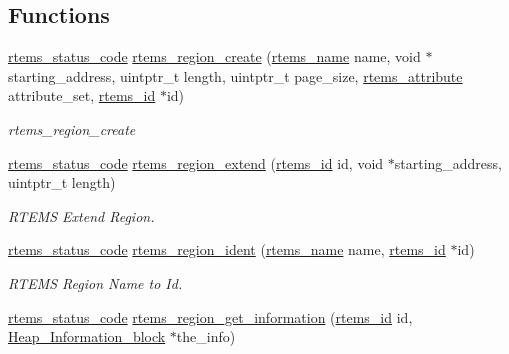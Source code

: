\subsection*{Functions}
\begin{DoxyCompactItemize}
\item 
\mbox{\hyperlink{group__ClassicStatus_ga545d41846817eaba6143d52ee4d9e9fe}{rtems\+\_\+status\+\_\+code}} \mbox{\hyperlink{group__ClassicRegion_ga024758f91cbf73e06cbc4c85df83d1ca}{rtems\+\_\+region\+\_\+create}} (\mbox{\hyperlink{group__ClassicTasks_ga55fb63c49f68c0cbd9bee004da15b1fd}{rtems\+\_\+name}} name, void $\ast$starting\+\_\+address, uintptr\+\_\+t length, uintptr\+\_\+t page\+\_\+size, \mbox{\hyperlink{group__ClassicAttributes_gaea40313cf78ed843e09c4315d0a10f79}{rtems\+\_\+attribute}} attribute\+\_\+set, \mbox{\hyperlink{group__ClassicTasks_gab20892b814dced7dd4e5b9bf42becd57}{rtems\+\_\+id}} $\ast$id)
\begin{DoxyCompactList}\small\item\em rtems\+\_\+region\+\_\+create \end{DoxyCompactList}\item 
\mbox{\hyperlink{group__ClassicStatus_ga545d41846817eaba6143d52ee4d9e9fe}{rtems\+\_\+status\+\_\+code}} \mbox{\hyperlink{group__ClassicRegion_gaf15895fc35fc646371de8cacfec9cbb6}{rtems\+\_\+region\+\_\+extend}} (\mbox{\hyperlink{group__ClassicTasks_gab20892b814dced7dd4e5b9bf42becd57}{rtems\+\_\+id}} id, void $\ast$starting\+\_\+address, uintptr\+\_\+t length)
\begin{DoxyCompactList}\small\item\em R\+T\+E\+MS Extend Region. \end{DoxyCompactList}\item 
\mbox{\hyperlink{group__ClassicStatus_ga545d41846817eaba6143d52ee4d9e9fe}{rtems\+\_\+status\+\_\+code}} \mbox{\hyperlink{group__ClassicRegion_ga6826b0f936366da80908e31ac9c16422}{rtems\+\_\+region\+\_\+ident}} (\mbox{\hyperlink{group__ClassicTasks_ga55fb63c49f68c0cbd9bee004da15b1fd}{rtems\+\_\+name}} name, \mbox{\hyperlink{group__ClassicTasks_gab20892b814dced7dd4e5b9bf42becd57}{rtems\+\_\+id}} $\ast$id)
\begin{DoxyCompactList}\small\item\em R\+T\+E\+MS Region Name to Id. \end{DoxyCompactList}\item 
\mbox{\hyperlink{group__ClassicStatus_ga545d41846817eaba6143d52ee4d9e9fe}{rtems\+\_\+status\+\_\+code}} \mbox{\hyperlink{group__ClassicRegion_ga21008d667508d701ad822f08f1dab568}{rtems\+\_\+region\+\_\+get\+\_\+information}} (\mbox{\hyperlink{group__ClassicTasks_gab20892b814dced7dd4e5b9bf42becd57}{rtems\+\_\+id}} id, \mbox{\hyperlink{structHeap__Information__block}{Heap\+\_\+\+Information\+\_\+block}} $\ast$the\+\_\+info)

\end{DoxyCompactItemize}
